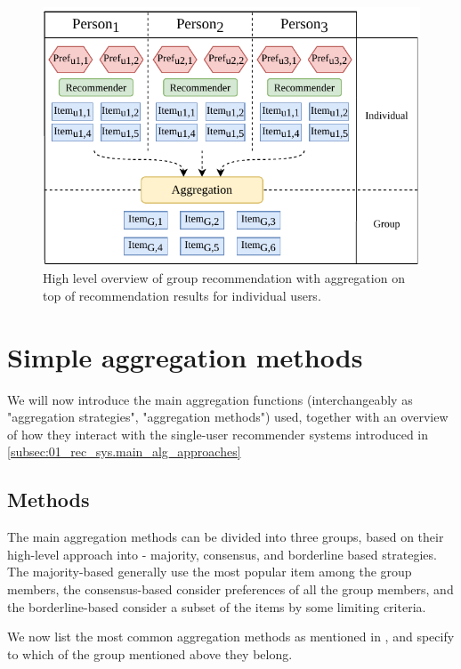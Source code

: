 \begin{figure}[htbp]
    \centering
    \includegraphics{img/after-rec-aggregation.pdf}
    \caption{High level overview of group recommendation with aggregation on top of recommendation results for individual users.}
    \label{fig:after_rec_agg}
\end{figure}






\section{Simple aggregation methods}\label{sec:03_simple_aggregation_metods}
We will now introduce the main aggregation functions (interchangeably as "aggregation strategies", "aggregation methods") used, together with an overview of how they interact with the single-user recommender systems introduced in \ref{subsec:01_rec_sys.main_alg_approaches}
\subsection{Methods}\label{subsec:03_simple_aggregation_methods.methods}

The main aggregation methods can be divided into three groups, based on their high-level approach into - majority, consensus, and borderline based strategies. The majority-based generally use the most popular item among the group members, the consensus-based consider preferences of all the group members, and the borderline-based consider a subset of the items by some limiting criteria.

We now list the most common aggregation methods as mentioned in \cite{grouprecommendersystems_felfernig2018group}, \cite{masthoff_2011_group_rec_systems} and \cite{masthoff_2004_group_modeling} specify to which of the group mentioned above they belong.

